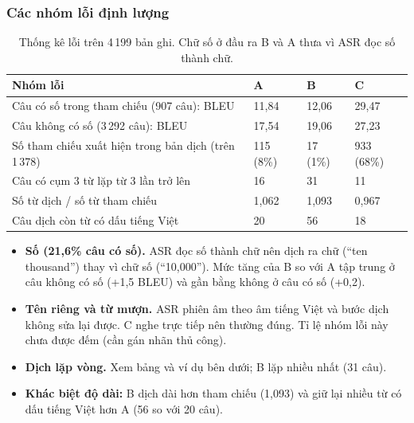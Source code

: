 \documentclass[12pt,a4paper]{article}
\begin{document}
\subsubsection{Các nhóm lỗi định lượng}
\begin{table}[H]\centering\small
\begin{tabularx}{\textwidth}{>{\raggedright\arraybackslash}p{3.6cm}YYY}\toprule
Nhóm lỗi & A & B & C\\\midrule
Câu có số trong tham chiếu (907 câu): BLEU & 11,84 & 12,06 & 29,47\\
Câu không có số (3\,292 câu): BLEU & 17,54 & 19,06 & 27,23\\
Số tham chiếu xuất hiện trong bản dịch (trên 1\,378) & 115 (8\%) & 17 (1\%) & 933 (68\%)\\
Câu có cụm 3 từ lặp từ 3 lần trở lên & 16 & 31 & 11\\
Số từ dịch / số từ tham chiếu & 1,062 & 1,093 & 0,967\\
Câu dịch còn từ có dấu tiếng Việt & 20 & 56 & 18\\\bottomrule
\end{tabularx}
\caption{Thống kê lỗi trên 4\,199 bản ghi. Chữ số ở đầu ra B và A thưa vì ASR đọc số thành chữ.}
\end{table}
\begin{itemize}[nosep]
\item \textbf{Số (21,6\% câu có số).} ASR đọc số thành chữ nên dịch ra chữ (``ten thousand'') thay vì chữ số (``10,000''). Mức tăng của B so với A tập trung ở câu không có số (+1,5 BLEU) và gần bằng không ở câu có số (+0,2).
\item \textbf{Tên riêng và từ mượn.} ASR phiên âm theo âm tiếng Việt và bước dịch không sửa lại được. C nghe trực tiếp nên thường đúng. Tỉ lệ nhóm lỗi này chưa được đếm (cần gán nhãn thủ công).
\item \textbf{Dịch lặp vòng.} Xem bảng và ví dụ bên dưới; B lặp nhiều nhất (31 câu).
\item \textbf{Khác biệt độ dài:} B dịch dài hơn tham chiếu (1,093) và giữ lại nhiều từ có dấu tiếng Việt hơn A (56 so với 20 câu).
\end{itemize}
\end{document}

